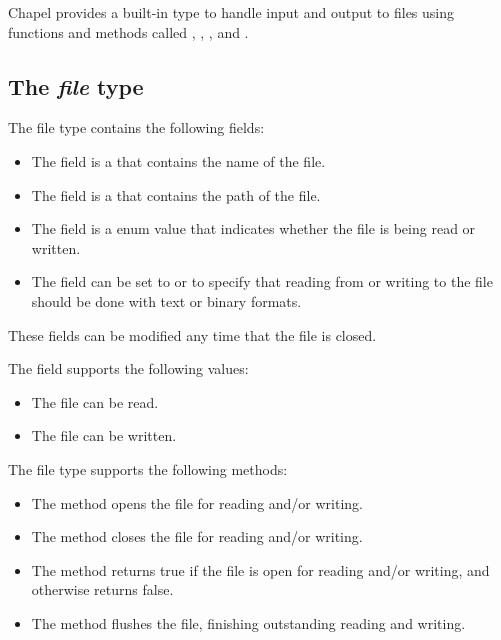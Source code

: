 \label{Input_and_Output}

Chapel provides a built-in  type to handle input and output
to files using functions and methods called , , 
, and .

\subsection{The {\em file} type}

The file type contains the following fields:
\begin{itemize}
\item
The  field is a  that contains the name of
the file.
\item
The  field is a  that contains the path of the
file.
\item
The  field is a  enum value that indicates
whether the file is being read or written.
\item
The  field can be set to  or  to
specify that reading from or writing to the file should be done with
text or binary formats.
\end{itemize}
These fields can be modified any time that the file is closed.

The  field supports the following  values:
\begin{itemize}
\item
{} The file can be read.
\item
{} The file can be written.
\end{itemize}

The file type supports the following methods:
\begin{itemize}
\item
The  method opens the file for reading and/or writing.
\item
The  method closes the file for reading and/or writing.
\item
The  method returns true if the file is open for reading
and/or writing, and otherwise returns false.
\item
The  method flushes the file, finishing outstanding
reading and writing.
\end{itemize}

